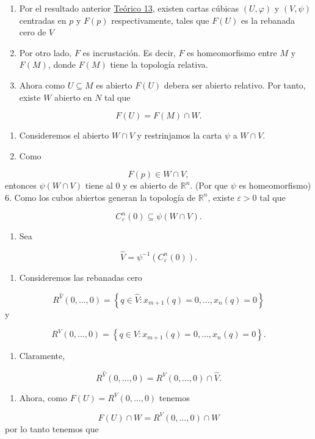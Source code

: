 \begin{bookproof}{}
\begin{enumerate}
\item Por el resultado anterior \hyperref[blk:d6bd60]{Teórico 13}, existen cartas cúbicas $(U,\varphi)$ y $(V,\psi)$ centradas en $p$ y $F(p)$ respectivamente, tales que $F(U)$ es la rebanada cero de $V$
\item Por otro lado, $F$ es incrustación. Es decir, $F$ es homeomorfismo entre $M$ y $F(M)$, donde $F(M)$ tiene la topología relativa.
\item Ahora como $U\subseteq M$ es abierto $F(U)$ debera ser abierto relativo. Por tanto, existe $W$ abierto en $N$ tal que
\end{enumerate}
\[
F(U)=F(M)\cap W.
\]
\begin{enumerate}[start=4]
\item Consideremos el abierto $W\cap V$ y restrinjamos la carta $\psi$ a $W\cap V$. 
\item Como
\end{enumerate}
\[
F(p)\in W\cap V,
\]
entonces $\psi(W\cap V)$ tiene al $0$ y es abierto de $\mathbb{R}^n$. (Por que $\psi$ es homeomorfismo) 6. Como los cubos abiertos generan la topología de $\mathbb{R}^n$, existe $\varepsilon>0$ tal que

\[
C_\varepsilon^n(0)\subseteq \psi(W\cap V).
\]
\begin{enumerate}[start=7]
\item Sea
\end{enumerate}
\[
\widehat V=\psi^{-1}\left(C_\varepsilon^n(0)\right).
\]
\begin{enumerate}[start=8]
\item Consideremos las rebanadas cero
\end{enumerate}
\[
R^{\widehat V}(0,\ldots,0)=\left\{q\in \widehat V:x_{m+1}(q)=0,\ldots,x_n(q)=0\right\}
\]
y

\[
R^V(0,\ldots,0)=\left\{q\in V:x_{m+1}(q)=0,\ldots,x_n(q)=0\right\}.
\]
\begin{enumerate}[start=9]
\item Claramente,
\end{enumerate}
\[
R^{\widehat V}(0,\ldots,0)=R^V(0,\ldots,0)\cap \widehat V.
\]
\begin{enumerate}[start=10]
\item Ahora, como $F(U)=R^{V}(0,\ldots,0)$ tenemos
\end{enumerate}
\[
F(U)\cap W=R^V(0,\ldots,0)\cap W
\]
por lo tanto tenemos que


\end{bookproof}

